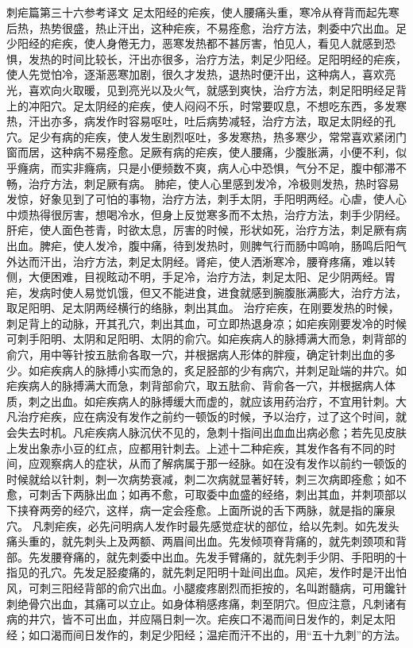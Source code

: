 \documentclass[12pt,UTF8]{ctexbook}
\begin{document}
刺疟篇第三十六参考译文
足太阳经的疟疾，使人腰痛头重，寒冷从脊背而起先寒后热，热势很盛，热止汗出，这种疟疾，不易痊愈，治疗方法，刺委中穴出血。足少阳经的疟疾，使人身倦无力，恶寒发热都不甚厉害，怕见人，看见人就感到恐惧，发热的时间比较长，汗出亦很多，治疗方法，刺足少阳经。足阳明经的疟疾，使人先觉怕冷，逐渐恶寒加剧，很久才发热，退热时便汗出，这种病人，喜欢亮光，喜欢向火取暖，见到亮光以及火气，就感到爽快，治疗方法，刺足阳明经足背上的冲阳穴。足太阴经的疟疾，使人闷闷不乐，时常要叹息，不想吃东西，多发寒热，汗出亦多，病发作时容易呕吐，吐后病势减轻，治疗方法，取足太阴经的孔穴。足少有病的疟疾，使人发生剧烈呕吐，多发寒热，热多寒少，常常喜欢紧闭门窗而居，这种病不易痊愈。足厥有病的疟疾，使人腰痛，少腹胀满，小便不利，似乎癃病，而实非癃病，只是小便频数不爽，病人心中恐惧，气分不足，腹中郁滞不畅，治疗方法，刺足厥有病。
肺疟，使人心里感到发冷，冷极则发热，热时容易发惊，好象见到了可怕的事物，治疗方法，刺手太阴，手阳明两经。心虐，使人心中烦热得很厉害，想喝冷水，但身上反觉寒多而不太热，治疗方法，刺手少阴经。肝疟，使人面色苍青，时欲太息，厉害的时候，形状如死，治疗方法，刺足厥有病出血。脾疟，使人发冷，腹中痛，待到发热时，则脾气行而肠中鸣响，肠鸣后阳气外达而汗出，治疗方法，刺足太阴经。肾疟，使人洒淅寒冷，腰脊疼痛，难以转侧，大便困难，目视眩动不明，手足冷，治疗方法，刺足太阳、足少阴两经。胃疟，发病时使人易觉饥饿，但又不能进食，进食就感到腕腹胀满膨大，治疗方法，取足阳明、足太阴两经横行的络脉，刺出其血。
治疗疟疾，在刚要发热的时候，刺足背上的动脉，开其孔穴，刺出其血，可立即热退身凉；如疟疾刚要发冷的时候可刺手阳明、太阴和足阳明、太阴的俞穴。如疟疾病人的脉搏满大而急，刺背部的俞穴，用中等针按五胠俞各取一穴，并根据病人形体的胖瘦，确定针刺出血的多少。如疟疾病人的脉搏小实而急的，炙足胫部的少有病穴，并刺足趾端的井穴。如疟疾病人的脉搏满大而急，刺背部俞穴，取五胠俞、背俞各一穴，并根据病人体质，刺之出血。如疟疾病人的脉搏缓大而虚的，就应该用药治疗，不宜用针刺。大凡治疗疟疾，应在病没有发作之前约一顿饭的时候，予以治疗，过了这个时间，就会失去时机。凡疟疾病人脉沉伏不见的，急刺十指间出血血出病必愈；若先见皮肤上发出象赤小豆的红点，应都用针刺去。上述十二种疟疾，其发作各有不同的时间，应观察病人的症状，从而了解病属于那一经脉。如在没有发作以前约一顿饭的时候就给以针刺，刺一次病势衰减，刺二次病就显著好转，刺三次病即痊愈；如不愈，可刺舌下两脉出血；如再不愈，可取委中血盛的经络，刺出其血，并刺项部以下挟脊两旁的经穴，这样，病一定会痊愈。上面所说的舌下两脉，就是指的廉泉穴。
凡刺疟疾，必先问明病人发作时最先感觉症状的部位，给以先刺。如先发头痛头重的，就先刺头上及两额、两眉间出血。先发倾项脊背痛的，就先刺颈项和背部。先发腰脊痛的，就先刺委中出血。先发手臂痛的，就先刺手少阴、手阳明的十指见的孔穴。先发足胫痠痛的，就先刺足阳明十趾间出血。风疟，发作时是汗出怕风，可刺三阳经背部的俞穴出血。小腿痠疼剧烈而拒按的，名叫跗髓病，可用鑱针刺绝骨穴出血，其痛可以立止。如身体稍感疼痛，刺至阴穴。但应注意，凡刺诸有病的井穴，皆不可出血，并应隔日刺一次。疟疾口不渴而间日发作的，刺足太阳经；如口渴而间日发作的，刺足少阳经；温疟而汗不出的，用“五十九刺”的方法。
\end{document}
